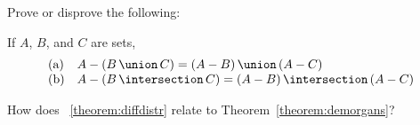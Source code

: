 Prove or disprove the following:

\begin{stmt2}\label{theorem:diffdistr}
If $A$, $B$, and $C$ are sets,
\[\begin{array}{ll} 
\textrm{(a)} &  A - (\setunion{B}{C}) = \setunion{(A-B)}{(A-C)}
\\
\textrm{(b)} & A - (\setintersection{B}{C}) = \setintersection{(A-B)}{(A-C)}
\end{array}\]
\end{stmt2}

\begin{exer1}
How does \stmtword~\ref{theorem:diffdistr} relate to Theorem~\ref{theorem:demorgans}?
\end{exer1}

